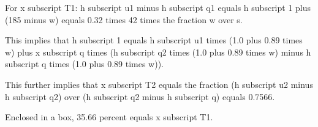 For x subscript T1: h subscript u1 minus h subscript q1 equals h subscript 1 plus (185 minus w) equals 0.32 times 42 times the fraction w over s.

This implies that h subscript 1 equals h subscript u1 times (1.0 plus 0.89 times w) plus x subscript q times (h subscript q2 times (1.0 plus 0.89 times w) minus h subscript q times (1.0 plus 0.89 times w)).

This further implies that x subscript T2 equals the fraction (h subscript u2 minus h subscript q2) over (h subscript q2 minus h subscript q) equals 0.7566.

Enclosed in a box, 35.66 percent equals x subscript T1.